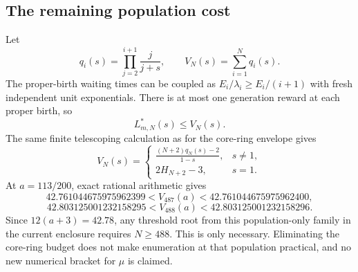 \subsection{The remaining population cost}

Let
\[
 q_i(s)=\prod_{j=2}^{i+1}\frac{j}{j+s},\qquad
 V_N(s)=\sum_{i=1}^{N}q_i(s).
\]
The proper-birth waiting times can be coupled as
$E_i/\lambda_i\ge E_i/(i+1)$ with fresh independent unit
exponentials. There is at most one generation reward at each proper
birth, so
\[
 L^*_{m,N}(s)\le V_N(s).
\]
The same finite telescoping calculation as for the core-ring envelope
gives
\[
 V_N(s)=
 \begin{cases}
 \displaystyle\frac{(N+2)q_N(s)-2}{1-s},&s\ne1,\\[5pt]
 2H_{N+2}-3,&s=1.
 \end{cases}
\]
At $a=113/200$, exact rational arithmetic gives
\[
 42.761044675975962399<V_{487}(a)<42.761044675975962400,
\]
\[
 42.803125001232158295<V_{488}(a)<42.803125001232158296.
\]
Since $12(a+3)=42.78$, any threshold root from this population-only
family in the current enclosure requires $N\ge488$. This is only
necessary. Eliminating the core-ring budget does not make enumeration
at that population practical, and no new numerical bracket for $\mu$
is claimed.
